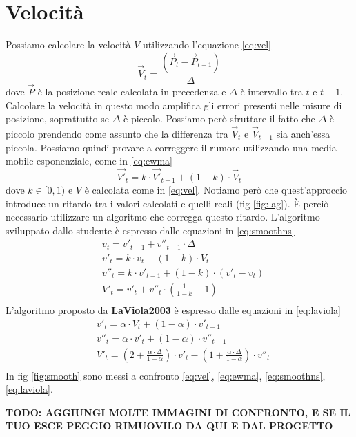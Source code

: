 \chapter{Velocità}
\label{sec:velocita}

Possiamo calcolare la velocità $V$ utilizzando l'equazione \ref{eq:vel}
\begin{equation}
    \label{eq:vel}
    \vec{V}_t = \frac{(\vec{P}_t - \vec{P}_{t-1})}{\Delta}
\end{equation}
dove $\vec{P}$ è la posizione reale calcolata in precedenza e $\Delta$ è intervallo tra $t$ e $t-1$.
Calcolare la velocità in questo modo amplifica gli errori presenti nelle misure di posizione, soprattutto se $\Delta$ è piccolo.
Possiamo però sfruttare il fatto che $\Delta$ è piccolo prendendo come assunto che la differenza tra $\vec{V}_t$ e $\vec{V}_{t-1}$ sia anch'essa piccola.
Possiamo quindi provare a correggere il rumore utilizzando una media mobile esponenziale, come in \ref{eq:ewma}
\begin{equation}
    \label{eq:ewma}
    \vec{V'}_t = k \cdot \vec{V'}_{t-1} + (1-k) \cdot \vec{V}_t
\end{equation}
dove $k \in [0, 1)$ e $V$ è calcolata come in \ref{eq:vel}.
Notiamo però che quest'approccio introduce un ritardo tra i valori calcolati e quelli reali (fig \ref{fig:lag}).
È perciò necessario utilizzare un algoritmo che corregga questo ritardo.
L'algoritmo sviluppato dallo studente è espresso dalle equazioni in \ref{eq:smoothns}
\begin{equation}
    \label{eq:smoothns}
    \begin{split}
        & v_t = v'_{t-1} + v''_{t-1} \cdot \Delta \\
        & v'_t = k \cdot v_t + (1-k) \cdot V_t \\
        & v''_t = k \cdot v'_{t-1} + (1-k) \cdot (v'_t - v_t) \\
        & V'_t = v'_t + v''_t \cdot \left(\frac{1}{1-k} - 1\right) \\
    \end{split}
\end{equation}
L'algoritmo proposto da \textbf{LaViola2003} è espresso dalle equazioni in \ref{eq:laviola}
\begin{equation}
    \label{eq:laviola}
    \begin{split}
        & v'_t = \alpha \cdot V_t + (1-\alpha) \cdot v'_{t-1} \\
        & v''_t = \alpha \cdot v'_{t} + (1-\alpha) \cdot v''_{t-1} \\
        & V'_t = \left(2 + \frac{\alpha \cdot \Delta}{1 - \alpha}\right) \cdot v'_t - \left(1 + \frac{\alpha \cdot \Delta}{1 - \alpha}\right) \cdot v''_t \\
    \end{split}
\end{equation}
In fig \ref{fig:smooth} sono messi a confronto \ref{eq:vel}, \ref{eq:ewma}, \ref{eq:smoothns}, \ref{eq:laviola}.

\textbf{TODO: AGGIUNGI MOLTE IMMAGINI DI CONFRONTO, E SE IL TUO ESCE PEGGIO RIMUOVILO DA QUI E DAL PROGETTO}
